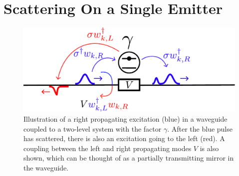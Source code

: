 \section{Scattering On a Single Emitter \label{sec:lodahl}}
\begin{figure}[H]
    \centering
    \includegraphics[width=\linewidth]{figures/lodahl_waveguide.pdf}
    \caption{Illustration of a right propagating excitation (blue) in a waveguide coupled to a two-level system with the factor $\gamma$. After the blue pulse has scattered, there is also an excitation going to the left (red). A coupling between the left and right propagating modes $V$ is also shown, which can be thought of as a partially transmitting mirror in the waveguide.}
    \label{fig:lodahl_sketch}
\end{figure}


